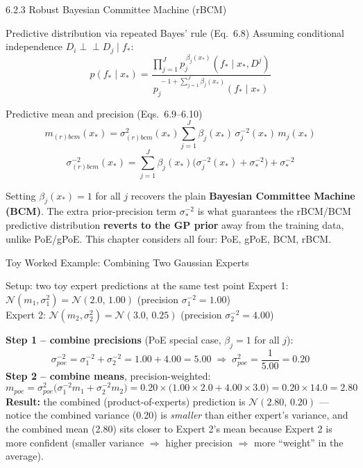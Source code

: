 \documentclass[aspectratio=169,10pt]{beamer}
\newcommand{\Norm}{\mathcal{N}}
\begin{document}
\begin{frame}{6.2.3 Robust Bayesian Committee Machine (rBCM)}
  \footnotesize
  \begin{block}{Predictive distribution via repeated Bayes' rule (Eq.\ 6.8)}
    Assuming conditional independence $D_i \perp\!\!\!\perp D_j \mid f_*$:
    \[
      p(f_*\mid x_*) = \frac{\displaystyle\prod_{j=1}^{J} p_j^{\,\beta_j(x_*)}(f_*\mid x_*, D^j)}
                             {\displaystyle p_j^{\,-1+\sum_{j=1}^{J}\beta_j(x_*)}(f_*\mid x_*)}
    \]
  \end{block}
  \vspace{-0.3em}
  \begin{block}{Predictive mean and precision (Eqs.\ 6.9--6.10)}
    \[
      m_{(r)bcm}(x_*) = \sigma^2_{(r)bcm}(x_*)\sum_{j=1}^{J}\beta_j(x_*)\,\sigma_j^{-2}(x_*)\,m_j(x_*)
    \]
    \[
      \sigma^{-2}_{(r)bcm}(x_*) = \sum_{j=1}^{J}\beta_j(x_*)\bigl(\sigma_j^{-2}(x_*)+\sigma_*^{-2}\bigr) + \sigma_*^{-2}
    \]
  \end{block}
  \vspace{-0.2em}
  Setting $\beta_j(x_*)=1$ for all $j$ recovers the plain \textbf{Bayesian
  Committee Machine (BCM)}. The extra prior-precision term $\sigma_*^{-2}$ is
  what guarantees the rBCM/BCM predictive distribution \textbf{reverts to the
  GP prior} away from the training data, unlike PoE/gPoE. This chapter
  considers all four: PoE, gPoE, BCM, rBCM.
\end{frame}

\begin{frame}{Toy Worked Example: Combining Two Gaussian Experts}
  \begin{block}{Setup: two toy expert predictions at the same test point}
    Expert 1: $\Norm(m_1, \sigma_1^2) = \Norm(2.0,\, 1.00)$ \quad(precision $\sigma_1^{-2}=1.00$)\\
    Expert 2: $\Norm(m_2, \sigma_2^2) = \Norm(3.0,\, 0.25)$ \quad(precision $\sigma_2^{-2}=4.00$)
  \end{block}
  \textbf{Step 1 -- combine precisions} (PoE special case, $\beta_j=1$ for all $j$):
  \[
    \sigma^{-2}_{poe} = \sigma_1^{-2} + \sigma_2^{-2} = 1.00 + 4.00 = 5.00
    \;\Longrightarrow\; \sigma^2_{poe} = \frac{1}{5.00} = 0.20
  \]
  \textbf{Step 2 -- combine means}, precision-weighted:
  \[
    m_{poe} = \sigma^2_{poe}\bigl(\sigma_1^{-2} m_1 + \sigma_2^{-2} m_2\bigr)
            = 0.20\times\bigl(1.00\times 2.0 + 4.00\times 3.0\bigr)
            = 0.20 \times 14.0 = 2.80
  \]
  \textbf{Result:} the combined (product-of-experts) prediction is
  $\Norm(2.80,\, 0.20)$ --- notice the combined variance (0.20) is
  \emph{smaller} than either expert's variance, and the combined mean
  (2.80) sits closer to Expert 2's mean because Expert 2 is more confident
  (smaller variance $\Rightarrow$ higher precision $\Rightarrow$ more
  ``weight'' in the average).
\end{frame}
\end{document}
